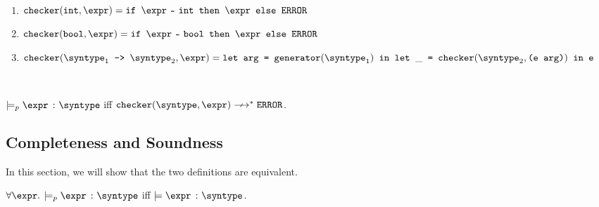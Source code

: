 \begin{definition}
  \label{def_checkCore}
  \ \par
  \begin{enumerate}
      \item $\mkche{\tint}{\expr} = \ife{\matches{\expr}{\tint}}{\expr}{\eerror}$
      \item $\mkche{\tbool}{\expr} = \ife{\matches{\expr}{\tbool}}{\expr}{\eerror}$
      \item $\mkche{\mkfun{\syntype_1}{\syntype_2}}{\expr} = \\
       \texttt{let arg = }\mkgen{\syntype_1} \texttt{ in }\letin{\_}{\mkche{\syntype_2}{\texttt{(e arg)}}}{\texttt{e}}$
   \end{enumerate}
\end{definition}

\begin{definition}
  \ \par
  $\models_p \hastype{\expr}{\syntype}$ iff $\mkche{\syntype}{\expr} \nsmallsteps[] \eerror$.
\end{definition}

\subsection{Completeness and Soundness}

In this section, we will show that the two definitions are equivalent.

\begin{theorem}
  $\forall \expr.$ $\models_p \hastype{\expr}{\syntype}$ iff $\models \hastype{\expr}{\syntype}$.
\end{theorem}

